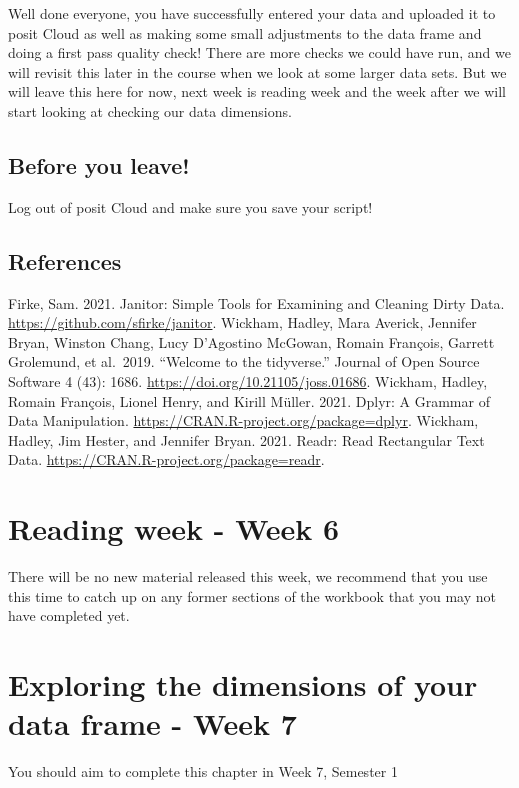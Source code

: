 \documentclass[
]{book}
\begin{document}
Well done everyone, you have successfully entered your data and uploaded it to posit Cloud as well as making some small adjustments to the data frame and doing a first pass quality check! There are more checks we could have run, and we will revisit this later in the course when we look at some larger data sets. But we will leave this here for now, next week is reading week and the week after we will start looking at checking our data dimensions.

\section{Before you leave!}\label{before-you-leave}

Log out of posit Cloud and make sure you save your script!

\section{References}\label{references-1}

Firke, Sam. 2021. Janitor: Simple Tools for Examining and Cleaning Dirty Data. \url{https://github.com/sfirke/janitor}.
Wickham, Hadley, Mara Averick, Jennifer Bryan, Winston Chang, Lucy D'Agostino McGowan, Romain François, Garrett Grolemund, et al.~2019. ``Welcome to the tidyverse.'' Journal of Open Source Software 4 (43): 1686. \url{https://doi.org/10.21105/joss.01686}.
Wickham, Hadley, Romain François, Lionel Henry, and Kirill Müller. 2021. Dplyr: A Grammar of Data Manipulation. \url{https://CRAN.R-project.org/package=dplyr}.
Wickham, Hadley, Jim Hester, and Jennifer Bryan. 2021. Readr: Read Rectangular Text Data. \url{https://CRAN.R-project.org/package=readr}.

\chapter{Reading week - Week 6}\label{reading-week---week-6}

There will be no new material released this week, we recommend that you use this time to catch up on any former sections of the workbook that you may not have completed yet.

\chapter{Exploring the dimensions of your data frame - Week 7}\label{dimensions}

You should aim to complete this chapter in Week 7, Semester 1
\end{document}
